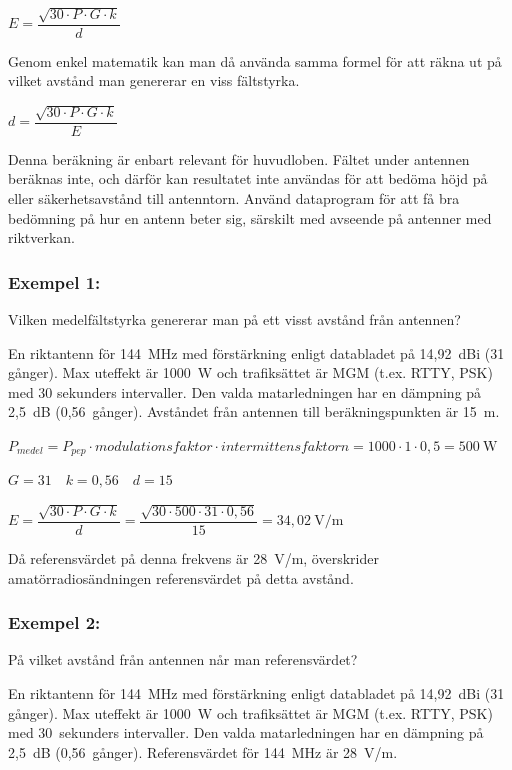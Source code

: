 \(E=\dfrac{\sqrt{30 \cdot P \cdot G \cdot k}}{d}\)

Genom enkel matematik kan man då använda samma formel för att räkna
ut på vilket avstånd man genererar en viss fältstyrka.

\(d=\dfrac{\sqrt{30 \cdot P \cdot G \cdot k}}{E}\)

Denna beräkning är enbart relevant för huvudloben.
Fältet under antennen beräknas inte, och därför kan resultatet inte användas
för att bedöma höjd på eller säkerhetsavstånd till antenntorn.
Använd dataprogram för att få bra bedömning på hur en antenn beter sig,
särskilt med avseende på antenner med riktverkan.

\subsubsection{Exempel 1:}

Vilken medelfältstyrka genererar man på ett visst avstånd från antennen?

En riktantenn för 144~MHz med förstärkning enligt databladet på
14,92~dBi (31 gånger).
Max uteffekt är 1000~W och trafiksättet är MGM (t.ex. RTTY, PSK) med
30 sekunders intervaller.
Den valda matarledningen har en dämpning på 2,5~dB (0,56~gånger).
Avståndet från antennen till beräkningspunkten är 15~m.

\(P_{medel} = P_{pep} \cdot modulationsfaktor \cdot intermittensfaktorn
= 1000 \cdot 1 \cdot 0,5 = 500\ \mathrm{W}\)

\(G = 31 \quad k = 0,56 \quad d = 15\)

\(E = \dfrac{\sqrt{30 \cdot P \cdot G \cdot k}}{d}
= \dfrac{\sqrt{30 \cdot 500 \cdot 31 \cdot 0,56}}{15}
= 34,02\ \mathrm{V/m}\)

Då referensvärdet på denna frekvens är 28~V/m, överskrider
amatörradiosändningen referensvärdet på detta avstånd.

\subsubsection{Exempel 2:}

På vilket avstånd från antennen når man referensvärdet?

En riktantenn för 144~MHz med förstärkning enligt databladet på
14,92~dBi (31 gånger).
Max uteffekt är 1000~W och trafiksättet är MGM (t.ex. RTTY, PSK) med
30~sekunders intervaller.
Den valda matarledningen har en dämpning på 2,5~dB (0,56~gånger).
Referensvärdet för 144~MHz är 28~V/m.

